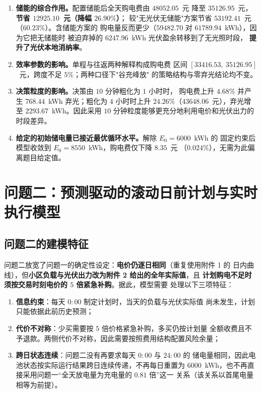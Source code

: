 \documentclass[withoutpreface,bwprint]{cumcmthesis}
\begin{document}
\begin{enumerate}
  \item \textbf{储能的综合作用。}配置储能后全天购电费由 $48052.05$~元
        降至 $35126.95$~元，\textbf{节省 $12925.10$~元（降幅 $26.90\%$）}；
        较"无光伏无储能"方案节省 $53192.41$~元（$60.23\%$）。含储能方案的
        购电量反而更少（$59482.70$ 对 $61789.94$~kWh），因为它把无储能时
        被迫弃掉的 $6247.96$~kWh 光伏盈余转移到了无光照时段，
        \textbf{提升了光伏本地消纳率}。
  \item \textbf{效率参数的影响。}单程与往返两种解释构成购电费
        区间 $[33416.53,\ 35126.95]$~元，跨度不足 $5\%$；两种口径下"谷充峰放"
        的策略结构与零弃光结论均不变。
  \item \textbf{决策粒度的影响。}决策由 $10$ 分钟粗化为 $1$ 小时时，
        购电费上升 $4.68\%$ 并产生 $768.44$~kWh 弃光；粗化为 $4$ 小时时上升
        $24.26\%$（$43648.06$~元），弃光增至 $2293.67$~kWh。因此采用
        $10$ 分钟粒度能够更充分地利用电价和光伏出力的时段差异。
  \item \textbf{给定的初始储电量已接近最优循环水平。}解除 $E_0=6000$~kWh 的
        固定约束后模型收敛到 $E_0=8550$~kWh，购电费仅下降 $8.35$~元
        （$0.024\%$），无需为此偏离题目给定值。
\end{enumerate}

\section{问题二：预测驱动的滚动日前计划与实时执行模型}

\subsection{问题二的建模特征}

问题二放宽了问题一的确定性设定：\textbf{电价仍逐日相同}（重复使用附件 1 的
日内曲线），但\textbf{小区负载与光伏出力改为附件 2 给出的全年实际值}，且
\textbf{计划购电不足时须按交易时刻电价的 $5$ 倍紧急补购}。据此，模型需要
处理以下三项特征：

\begin{enumerate}
  \item \textbf{信息约束}：每天 $0{:}00$ 制定计划时，当天的负载与光伏实际值
        尚未发生，计划只能依据此前历史预测；
  \item \textbf{代价不对称}：少买需要按 $5$ 倍价格紧急补购，多买仍按计划量
        全额收费且不予退款。两侧代价不对称，因此需要按照费用结构配置风险余量；
  \item \textbf{跨日状态连续}：问题二没有再要求每天 $0{:}00$ 与 $24{:}00$ 的
        储电量相同，因此电池状态按实际运行结果跨日连续传递，不再每日重置为
        $6000$~kWh，也不再直接采用问题一“全天放电量为充电量的 $0.81$ 倍”这一
        关系（该关系以首尾电量相等为前提）。
\end{enumerate}
\end{document}

